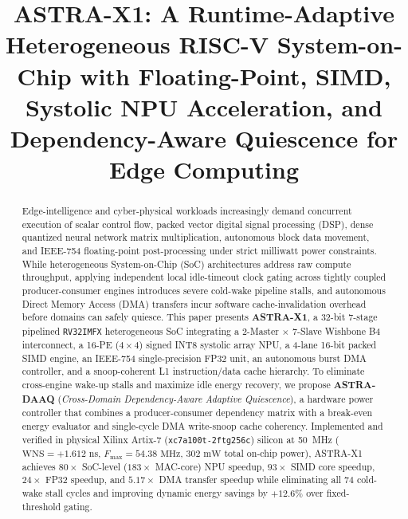 \documentclass[conference]{IEEEtran}
\begin{document}
\title{ASTRA-X1: A Runtime-Adaptive Heterogeneous RISC-V System-on-Chip with Floating-Point, SIMD, Systolic NPU Acceleration, and Dependency-Aware Quiescence for Edge Computing}

\author{
}

\maketitle

\begin{abstract}
Edge-intelligence and cyber-physical workloads increasingly demand concurrent execution of scalar control flow, packed vector digital signal processing (DSP), dense quantized neural network matrix multiplication, autonomous block data movement, and IEEE-754 floating-point post-processing under strict milliwatt power constraints. While heterogeneous System-on-Chip (SoC) architectures address raw compute throughput, applying independent local idle-timeout clock gating across tightly coupled producer-consumer engines introduces severe cold-wake pipeline stalls, and autonomous Direct Memory Access (DMA) transfers incur software cache-invalidation overhead before domains can safely quiesce. This paper presents \textbf{ASTRA-X1}, a 32-bit 7-stage pipelined \texttt{RV32IMFX} heterogeneous SoC integrating a 2-Master $\times$ 7-Slave Wishbone B4 interconnect, a 16-PE ($4 \times 4$) signed INT8 systolic array NPU, a 4-lane 16-bit packed SIMD engine, an IEEE-754 single-precision FP32 unit, an autonomous burst DMA controller, and a snoop-coherent L1 instruction/data cache hierarchy. To eliminate cross-engine wake-up stalls and maximize idle energy recovery, we propose \textbf{ASTRA-DAAQ} (\textit{Cross-Domain Dependency-Aware Adaptive Quiescence}), a hardware power controller that combines a producer-consumer dependency matrix with a break-even energy evaluator and single-cycle DMA write-snoop cache coherency. Implemented and verified in physical Xilinx Artix-7 (\texttt{xc7a100t-2ftg256c}) silicon at 50~MHz ($\text{WNS} = +1.612\text{ ns}$, $F_{\max} = 54.38\text{ MHz}$, $302\text{ mW}$ total on-chip power), ASTRA-X1 achieves $80\times$ SoC-level ($183\times$ MAC-core) NPU speedup, $93\times$ SIMD core speedup, $24\times$ FP32 speedup, and $5.17\times$ DMA transfer speedup while eliminating all 74 cold-wake stall cycles and improving dynamic energy savings by $+12.6\%$ over fixed-threshold gating.
\end{abstract}
\end{document}
